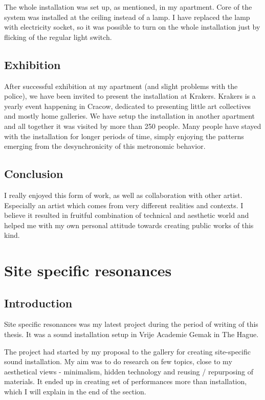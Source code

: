 \documentclass[12pt,a4paper,oneside]{report}
\begin{document}
The whole installation was set up, as mentioned, in my apartment. Core of the system was installed at the ceiling instead of a lamp. I have replaced the lamp with electricity socket, so it was possible to turn on the whole installation just by flicking of the regular light switch.

\subsection{Exhibition} After successful exhibition at my apartment (and slight problems with the police), we have been invited to present the installation at Krakers. Krakers is a yearly event happening in Cracow, dedicated to presenting little art collectives and mostly home galleries. We have setup the installation in another apartment and all together it was visited by more than 250 people. Many people have stayed with the installation for longer periods of time, simply enjoying the patterns emerging from the desynchronicity of this metronomic behavior.

\subsection{Conclusion} I really enjoyed this form of work, as well as collaboration with other artist. Especially an artist which comes from very different realities and contexts. I believe it resulted in fruitful combination of technical and aesthetic world and helped me with my own personal attitude towards creating public works of this kind.

\clearpage
\section{Site specific resonances}
\subsection{Introduction}
Site specific resonances was my latest project during the period of writing of this thesis. It was a sound installation setup in Vrije Academie Gemak in The Hague.

The project had started by my proposal to the gallery for creating site-specific sound installation. My aim was to do research on few topics, close to my aesthetical views - minimalism, hidden technology and reusing / repurposing of materials. It ended up in creating set of performances more than installation, which I will explain in the end of the section.
\end{document}
